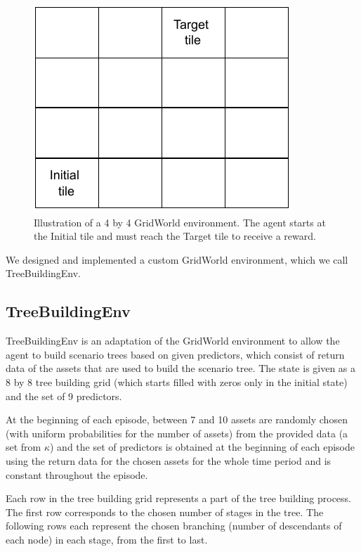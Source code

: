 \begin{figure}[H]
\centering
  \includegraphics[width=\linewidth / 3]{../img/gridworld_env_illustration.pdf}
  \caption{Illustration of a 4 by 4 GridWorld environment. The agent starts at the Initial tile and must reach the Target tile to receive a reward.}
  \label{fig:gridworldenv_illustration}
\end{figure}

We designed and implemented a custom GridWorld environment, which we call TreeBuildingEnv.

\subsection{TreeBuildingEnv}
\label{section:treebuildingenv}
TreeBuildingEnv is an adaptation of the GridWorld environment to allow the agent to build scenario trees based on given predictors, which consist of return data of the assets that are used to build the scenario tree. 
The state is given as a 8 by 8 tree building grid (which starts filled with zeros only in the initial state) and the set of 9 predictors. 

At the beginning of each episode, between 7 and 10 assets are randomly chosen (with uniform probabilities for the number of assets) from the provided data (a set from $\kappa$) and the set of predictors is obtained at the beginning of each episode using the return data for the chosen assets for the whole time period and is constant throughout the episode. 

Each row in the tree building grid represents a part of the tree building process. The first row corresponds to the chosen number of stages in the tree. The following rows each represent the chosen branching (number of descendants of each node) in each stage, from the first to last.

